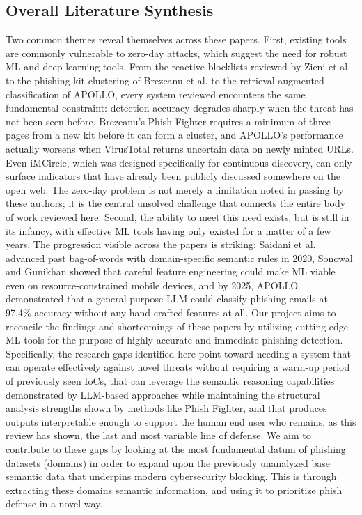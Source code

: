 \documentclass[conference]{IEEEtran}
\begin{document}
\subsection{Overall Literature Synthesis}
Two common themes reveal themselves across these papers. First, existing tools are commonly vulnerable to zero-day attacks, which suggest the need for robust ML and deep learning tools. From the reactive blocklists reviewed by Zieni et al.\cite{zieni_phishing_2023} to the phishing kit clustering of Brezeanu et al.\cite{brezeanu_phish_2025} to the retrieval-augmented classification of APOLLO\cite{desolda_apollo_2025}, every system reviewed encounters the same fundamental constraint: detection accuracy degrades sharply when the threat has not been seen before. Brezeanu's Phish Fighter requires a minimum of three pages from a new kit before it can form a cluster, and APOLLO's performance actually worsens when VirusTotal returns uncertain data on newly minted URLs. Even iMCircle, which was designed specifically for continuous discovery, can only surface indicators that have already been publicly discussed somewhere on the open web\cite{zhang1}. The zero-day problem is not merely a limitation noted in passing by these authors; it is the central unsolved challenge that connects the entire body of work reviewed here.
Second, the ability to meet this need exists, but is still in its infancy, with effective ML tools having only existed for a matter of a few years. The progression visible across the papers is striking: Saidani et al.\cite{saidani1} advanced past bag-of-words with domain-specific semantic rules in 2020, Sonowal and Gunikhan\cite{sonowal1} showed that careful feature engineering could make ML viable even on resource-constrained mobile devices, and by 2025, APOLLO demonstrated that a general-purpose LLM could classify phishing emails at 97.4\% accuracy without any hand-crafted features at all\cite{desolda_apollo_2025}. 
Our project aims to reconcile the findings and shortcomings of these papers by utilizing cutting-edge ML tools for the purpose of highly accurate and immediate phishing detection. Specifically, the research gaps identified here point toward needing a system that can operate effectively against novel threats without requiring a warm-up period of previously seen IoCs, that can leverage the semantic reasoning capabilities demonstrated by LLM-based approaches while maintaining the structural analysis strengths shown by methods like Phish Fighter, and that produces outputs interpretable enough to support the human end user who remains, as this review has shown, the last and most variable line of defense. We aim to contribute to these gaps by looking at the most fundamental datum of phishing datasets (domains) in order to expand upon the previously unanalyzed base semantic data that underpins modern cybersecurity blocking. This is through extracting these domains semantic information, and using it to prioritize phish defense in a novel way.
\end{document}
